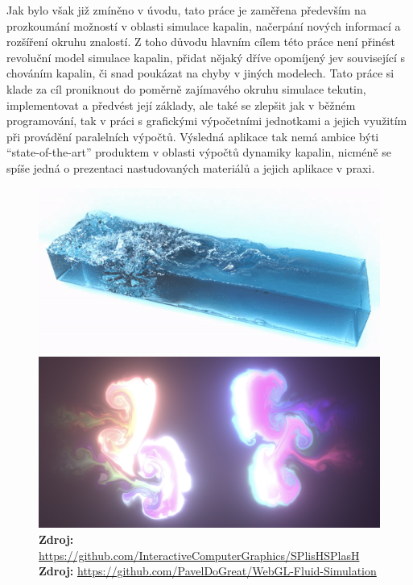 Jak bylo však již zmíněno v úvodu, tato práce je zaměřena především na prozkoumání možností v oblasti simulace kapalin, načerpání nových informací a rozšíření okruhu znalostí. Z toho důvodu hlavním cílem této práce není přinést revoluční model simulace kapalin, přidat nějaký dříve opomíjený jev související s chováním kapalin, či snad poukázat na chyby v jiných modelech. Tato práce si klade za cíl proniknout do poměrně zajímavého okruhu simulace tekutin, implementovat a předvést její základy, ale také se zlepšit jak v běžném programování, tak v práci s grafickými výpočetními jednotkami a jejich využitím při provádění paralelních výpočtů. Výsledná aplikace tak nemá ambice býti \enquote{state-of-the-art} produktem v oblasti výpočtů dynamiky kapalin, nicméně se spíše jedná o prezentaci nastudovaných materiálů a jejich aplikace v praxi.

\begin{figure}[h]\centering
	\centering
	\captionsetup{justification=centering}
	\includegraphics[width=0.5\linewidth]{obrazky-figures/splish-0.png}\hfill
	\includegraphics[width=0.5\linewidth]{obrazky-figures/webglFluid.jpg}\hfill
	\textbf{Zdroj: } \url{https://github.com/InteractiveComputerGraphics/SPlisHSPlasH} \newline
    \textbf{Zdroj: } \url{https://github.com/PavelDoGreat/WebGL-Fluid-Simulation}
	\label{fig:existingSolution}
\end{figure}

